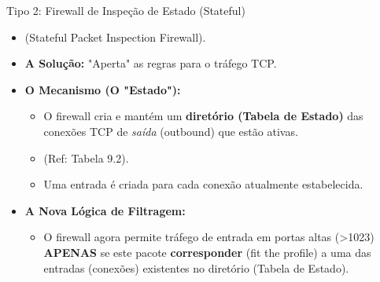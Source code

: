 \begin{frame}{Tipo 2: Firewall de Inspeção de Estado (Stateful)}
    \begin{itemize}
        \item (Stateful Packet Inspection Firewall).
        \item \textbf{A Solução:} "Aperta" as regras para o tráfego TCP.

        \item \textbf{O Mecanismo (O "Estado"):}
              \begin{itemize}
                  \item O firewall cria e mantém um \textbf{diretório (Tabela de Estado)} das conexões TCP de \textit{saída} (outbound) que estão ativas.
                  \item (Ref: Tabela 9.2).
                  \item Uma entrada é criada para cada conexão atualmente estabelecida.
              \end{itemize}

        \item \textbf{A Nova Lógica de Filtragem:}
              \begin{itemize}
                  \item O firewall agora permite tráfego de entrada em portas altas (>1023) \textbf{APENAS} se este pacote \textbf{corresponder} (fit the profile) a uma das entradas (conexões) existentes no diretório (Tabela de Estado).
              \end{itemize}
    \end{itemize}
\end{frame}

